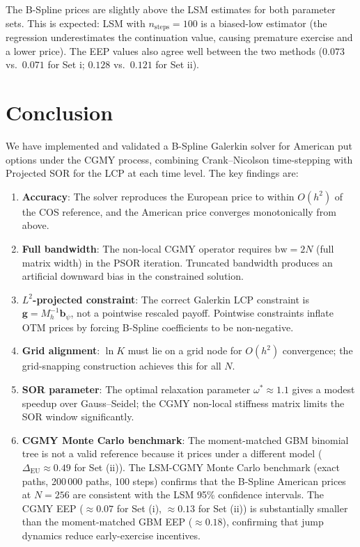\documentclass[11pt,a4paper]{article}
\begin{document}
The B-Spline prices are slightly above the LSM estimates for both parameter
sets.  This is expected: LSM with $n_{\mathrm{steps}}=100$ is a biased-low
estimator (the regression underestimates the continuation value, causing
premature exercise and a lower price).  The EEP values also agree well between
the two methods ($0.073$ vs.\ $0.071$ for Set i; $0.128$ vs.\ $0.121$ for
Set ii).

\section{Conclusion}

We have implemented and validated a B-Spline Galerkin solver for American put
options under the CGMY process, combining Crank--Nicolson time-stepping with
Projected SOR for the LCP at each time level.  The key findings are:

\begin{enumerate}
  \item \textbf{Accuracy}: The solver reproduces the European price to within
    $O(h^2)$ of the COS reference, and the American price converges
    monotonically from above.

  \item \textbf{Full bandwidth}: The non-local CGMY operator requires
    $\mathrm{bw}=2N$ (full matrix width) in the PSOR iteration. Truncated
    bandwidth produces an artificial downward bias in the constrained solution.

  \item \textbf{$L^2$-projected constraint}: The correct Galerkin LCP
    constraint is $\mathbf{g}=M_h^{-1}\mathbf{b}_\psi$, not a pointwise
    rescaled payoff.  Pointwise constraints inflate OTM prices by forcing
    B-Spline coefficients to be non-negative.

  \item \textbf{Grid alignment}: $\ln K$ must lie on a grid node for $O(h^2)$
    convergence; the grid-snapping construction achieves this for all $N$.

  \item \textbf{SOR parameter}: The optimal relaxation parameter
    $\omega^*\approx 1.1$ gives a modest speedup over Gauss--Seidel; the
    CGMY non-local stiffness matrix limits the SOR window significantly.

  \item \textbf{CGMY Monte Carlo benchmark}: The moment-matched GBM binomial
    tree is not a valid reference because it prices under a different model
    ($\Delta_{\mathrm{EU}} \approx 0.49$ for Set (ii)).  The LSM-CGMY Monte
    Carlo benchmark (exact paths, 200\,000 paths, 100 steps) confirms that the
    B-Spline American prices at $N=256$ are consistent with the LSM 95\%
    confidence intervals.  The CGMY EEP ($\approx 0.07$ for Set (i),
    $\approx 0.13$ for Set (ii)) is substantially smaller than the
    moment-matched GBM EEP ($\approx 0.18$), confirming that jump dynamics
    reduce early-exercise incentives.
\end{enumerate}
\end{document}
